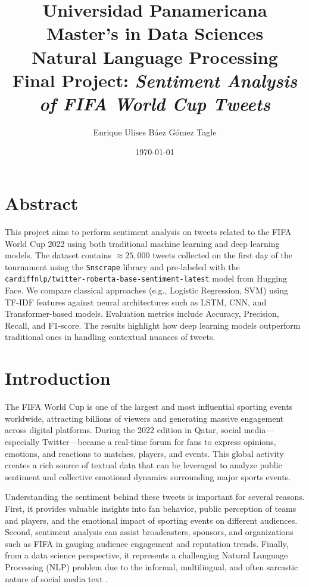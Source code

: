 \documentclass[10pt]{article}
\title{Universidad Panamericana \\ Master's in Data Sciences \\ Natural Language Processing \\ 
    \vspace{0.5cm} Final Project: \textit{Sentiment Analysis of FIFA World Cup Tweets}}
\author{Enrique Ulises Báez Gómez Tagle}
\date{\today}
\begin{document}
\maketitle
\tableofcontents
\newpage
\section*{Abstract}
This project aims to perform sentiment analysis on tweets related to the FIFA World Cup 2022 using both traditional machine learning and deep learning models. 
The dataset contains $\approx25,000$ tweets collected on the first day of the tournament using the \texttt{Snscrape} library and pre-labeled with the\\ \texttt{cardiffnlp/twitter-roberta-base-sentiment-latest} model from Hugging Face.
We compare classical approaches (e.g., Logistic Regression, SVM) using TF-IDF features against neural architectures such as LSTM, CNN, and Transformer-based models. 
Evaluation metrics include Accuracy, Precision, Recall, and F1-score. The results highlight how deep learning models outperform traditional ones in handling contextual nuances of tweets.
\section{Introduction}
The FIFA World Cup is one of the largest and most influential sporting events worldwide, attracting billions of viewers and generating massive engagement across digital platforms. During the 2022 edition in Qatar, social media—especially Twitter—became a real-time forum for fans to express opinions, emotions, and reactions to matches, players, and events. This global activity creates a rich source of textual data that can be leveraged to analyze public sentiment and collective emotional dynamics surrounding major sports events.

Understanding the sentiment behind these tweets is important for several reasons. First, it provides valuable insights into fan behavior, public perception of teams and players, and the emotional impact of sporting events on different audiences. Second, sentiment analysis can assist broadcasters, sponsors, and organizations such as FIFA in gauging audience engagement and reputation trends. Finally, from a data science perspective, it represents a challenging Natural Language Processing (NLP) problem due to the informal, multilingual, and often sarcastic nature of social media text \cite{ref1, ref2, ref3}.
\end{document}
